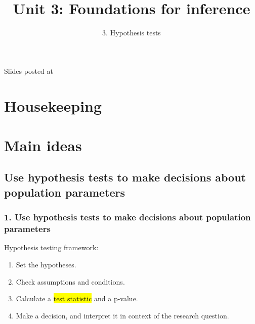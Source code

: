 \documentclass[slidestop,compress,mathserif,12pt,t,professionalfonts,xcolor=table]{beamer}
\title{Unit 3: Foundations for inference}
\subtitle{3. Hypothesis tests}
\author{\CourseName}
\date{}
\institute{\InstituteName}
\begin{document}



\begin{frame}[plain]

\titlepage

\vfill

{\scriptsize {} \hfill Slides posted at  \webURL{\CourseSite}}

\addtocounter{framenumber}{-1} 

\end{frame}


\section{Housekeeping}




\section{Main ideas}


\subsection{Use hypothesis tests to make decisions about population parameters}
\label{mi1}


\begin{frame}
\frametitle{1. Use hypothesis tests to make decisions about population parameters}

Hypothesis testing framework:

\begin{enumerate}

\item Set the hypotheses.

\item Check assumptions and conditions.

\item Calculate a \hl{test statistic} and a p-value.

\item Make a decision, and interpret it in context of the research question.

\end{enumerate}

\end{frame}
\end{document}
